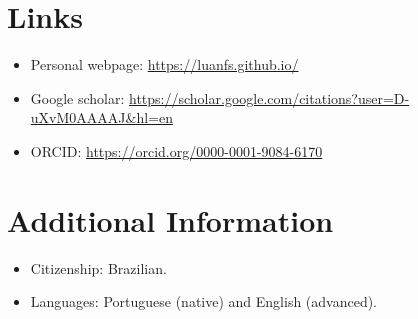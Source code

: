 \documentclass[letterpaper,11pt]{article}
\begin{document}
%
\section{Links}
\begin{itemize}
	\item Personal webpage:  \href{https://luanfs.github.io/}{https://luanfs.github.io/}
	\item Google scholar: \href{https://scholar.google.com/citations?user=D-uXvM0AAAAJ&hl=en}{https://scholar.google.com/citations?user=D-uXvM0AAAAJ\&hl=en}
	\item ORCID:  \href{https://orcid.org/0000-0001-9084-6170}{https://orcid.org/0000-0001-9084-6170}
\end{itemize}


\section{Additional Information}
\begin{itemize}
	\item Citizenship: Brazilian.
	\item Languages: Portuguese (native) and English (advanced).
\end{itemize}



\end{document}

